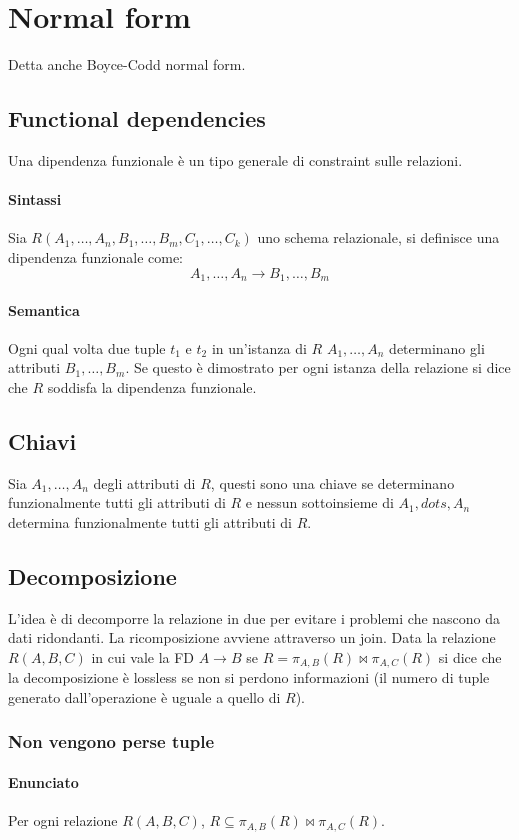\chapter{Normal form}
Detta anche Boyce-Codd normal form.
\section{Functional dependencies}
Una dipendenza funzionale \`e un tipo generale di constraint sulle relazioni.
\subsubsection{Sintassi}
Sia $R(A_1, \dots, A_n, B_1, \dots, B_m, C_1, \dots, C_k)$ uno schema relazionale, si definisce una dipendenza funzionale come:
\begin{equation*}
A_1,\dots,A_n\rightarrow B_1, \dots, B_m
\end{equation*}
\subsubsection{Semantica}
Ogni qual volta due tuple $t_1$ e $t_2$ in un'istanza di $R$ $A_1, \dots, A_n$ determinano gli attributi $B_1, \dots, B_m$. Se questo \`e dimostrato per ogni istanza
della relazione si dice che $R$ soddisfa la dipendenza funzionale. 
\section{Chiavi}
Sia $A_1, \dots, A_n$ degli attributi di $R$, questi sono una chiave se determinano funzionalmente tutti gli attributi di $R$ e nessun sottoinsieme di $A_1, dots, A_n$ determina funzionalmente tutti gli attributi di 
$R$. 
\section{Decomposizione}
L'idea \`e di decomporre la relazione in due per evitare i problemi che nascono da dati ridondanti. La ricomposizione avviene attraverso un join. Data la relazione $R(A,B,C)$ in cui vale la FD $A\rightarrow B$ se
$R=\pi_{A,B}(R)\bowtie\pi_{A,C}(R)$ si dice che la decomposizione \`e lossless se non si perdono informazioni (il numero di tuple generato dall'operazione \`e uguale a quello di $R$). 
\subsection{Non vengono perse tuple}
\subsubsection{Enunciato}
Per ogni relazione $R(A,B,C)$, $R\subseteq \pi_{A,B}(R)\bowtie\pi_{A,C}(R)$.
